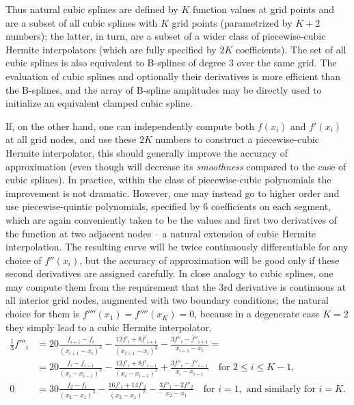 \documentclass[12pt]{article}
\begin{document}
Thus natural cubic splines are defined by $K$ function values at grid points and are a subset of all cubic splines with $K$ grid points (parametrized by $K+2$ numbers); the latter, in turn, are a subset of a wider class of piecewise-cubic Hermite interpolators (which are fully specified by $2K$ coefficients). The set of all cubic splines is also equivalent to B-splines of degree 3 over the same grid. The evaluation of cubic splines and optionally their derivatives is more efficient than the B-splines, and the array of B-spline amplitudes may be directly used to initialize an equivalent clamped cubic spline.

If, on the other hand, one can independently compute both $f(x_i)$ and $f'(x_i)$ at all grid nodes, and use these $2K$ numbers to construct a piecewise-cubic Hermite interpolator, this should generally improve the accuracy of approximation (even though will decrease its \textit{smoothness} compared to the case of cubic splines). In practice, within the class of piecewise-cubic polynomials the improvement is not dramatic. However, one may instead go to higher order and use piecewise-quintic polynomials, specified by 6 coefficients on each segment, which are again conveniently taken to be the values and first two derivatives of the function at two adjacent nodes -- a natural extension of cubic Hermite interpolation. The resulting curve will be twice continuously differentiable for any choice of $f''(x_i)$, but the accuracy of approximation will be good only if these second derivatives are assigned carefully. In close analogy to cubic splines, one may compute them from the requirement that the 3rd derivative is continuous at all interior grid nodes, augmented with two boundary conditions; the natural choice for them is $f''''(x_1)=f''''(x_K)=0$, because in a degenerate case $K=2$ they simply lead to a cubic Hermite interpolator.
\begin{subequations}
\begin{align}
\frac{1}{3} f'''_i
&= 20 \frac{f_{i+1}-f_i}{(x_{i+1}-x_i)^3} - \frac{12f'_i+8f'_{i+1}}{(x_{i+1}-x_i)^2} - \frac{3f''_i-f''_{i+1}}{x_{i+1}-x_i} = \\
&= 20 \frac{f_i-f_{i-1}}{(x_i-x_{i-1})^3} - \frac{12f'_i+8f'_{i-1}}{(x_i-x_{i-1})^2} + \frac{3f''_i-f''_{i-1}}{x_i-x_{i-1}}\quad \mbox{for }2\le i \le K-1, \nonumber \\
0 &= 30\frac{f_2-f_1}{(x_2-x_1)^3} - \frac{16f'_1+14f'_2}{(x_2-x_1)^2} - \frac{3f''_1-2f''_2}{x_2-x_1} \quad\mbox{for }i=1,\mbox{ and similarly for }i=K.
\end{align}
\end{subequations}
\end{document}
